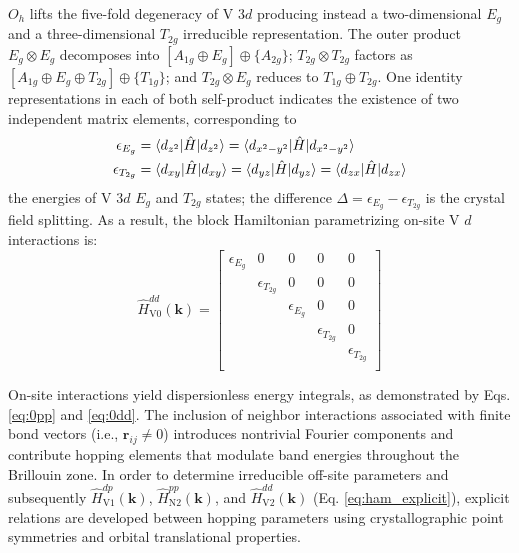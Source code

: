 \documentclass[twocolumn,showpacs,preprintnumbers,superscriptaddress,prb,floatfix,aps,10pt]{revtex4-1}
\renewcommand{\vec}[1]{\ensuremath{\mathbf{#1}}}
\newcommand*{\ham}{\hat{H}}
\begin{document}
$O_h$ lifts the five-fold degeneracy of V 3$d$ producing instead a two-dimensional $E_g$ and a three-dimensional $T_{2g}$ irreducible representation. The outer product $E_g \otimes E_g$ decomposes into $[A_{1g} \oplus E_g] \oplus \{A_{2g}\}$; $T_{2g} \otimes T_{2g}$ factors as $[A_{1g} \oplus E_{g} \oplus T_{2g}] \oplus \{T_{1g}\}$; and $T_{2g} \otimes E_g$ reduces to $T_{1g} \oplus T_{2g}$. One identity representations in each of both self-product indicates the existence of two independent matrix elements, corresponding to 
\begin{align}
\epsilon_{E_g} &
= \braket{d_{z^2}      | \ham | d_{z^2}} 
= \braket{d_{x^2-y^2}  | \ham | d_{x^2-y^2}  } \\
\epsilon_{T_{2g}} &
= \braket{d_{xy} | \ham | d_{xy} } 
= \braket{d_{yz} | \ham | d_{yz} }
= \braket{d_{zx} | \ham | d_{zx} }
\end{align}
the energies of V 3$d$ $E_g$ and $T_{2g}$ states; the difference $\Delta = \epsilon_{E_g} - \epsilon_{T_{2g}}$ is the crystal field splitting. As a result, the block Hamiltonian  parametrizing on-site V $d$ interactions is:
%
\begin{equation}
\label{eq:0dd}
\ham_{\textrm{V0}}^{dd}(\vec{k}) =
\begin{bmatrix}
 \epsilon_{E_g} & 0 & 0 & 0 & 0 \\
   & \epsilon_{T_{2g}} & 0 & 0 & 0 \\
   &   & \epsilon_{E_g} & 0 & 0 \\
   &   &   & \epsilon_{T_{2g}} & 0 \\
   &   &   &   & \epsilon_{T_{2g}} \\
\end{bmatrix}
\end{equation}

On-site interactions yield dispersionless energy integrals, as demonstrated by Eqs. \ref{eq:0pp} and \ref{eq:0dd}. The inclusion of neighbor interactions associated with finite bond vectors (i.e., $\vec{r}_{ij} \neq 0$) introduces nontrivial Fourier components and contribute hopping elements that modulate band energies throughout the Brillouin zone. In order to determine irreducible off-site parameters and subsequently $\ham_{\textrm{V}1}^{dp}(\vec{k})$, $\ham_{\textrm{N}2}^{pp}(\vec{k})$, and $\ham_{\textrm{V}2}^{dd}(\vec{k})$ (Eq. \ref{eq:ham_explicit}), explicit relations are developed between hopping parameters using crystallographic point symmetries and orbital translational properties. 
\end{document}
